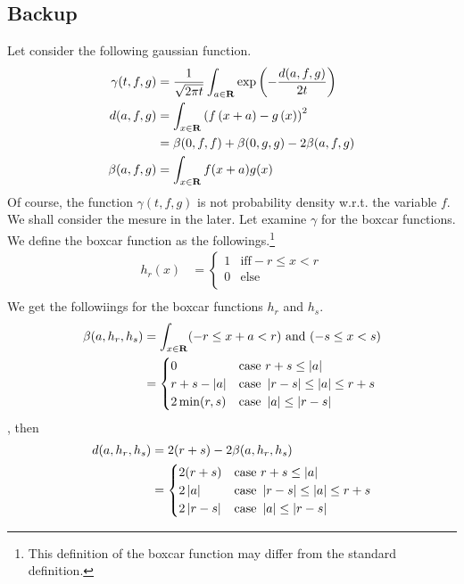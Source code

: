 \subsection{Backup}
Let consider the following gaussian function.
\begin{equation}\begin{split}\label{eq:f.gauss}
	\gamma(t,f,g) &= \frac{1}{\sqrt{2\pi t}}\int_{{a}\in{\mathbf{R}}}\exp\left({-\frac{d(a, f,g)}{2t}}\right) \\
	d(a,f,g) &= \int_{{x}\in{\mathbf{R}}}\left({f\left({x+a}\right)-g\left({x}\right)}\right)^2 \\
		&= \beta(0,f,f) + \beta(0,g,g) - 2\beta(a,f,g) \\
	\beta(a,f,g) &= \int_{{x}\in{\mathbf{R}}}f(x+a)g(x) \\
\end{split}\end{equation}
Of course, the function $\gamma(t,f,g)$ is not probability density w.r.t. the variable $f$.
We shall consider the mesure in the later.
Let examine $\gamma$ for the boxcar functions.
We define the boxcar function as the followings.\footnote {
	This definition of the boxcar function may differ from the standard definition.
}
\begin{equation}\begin{split}
	h_r(x) &= \begin{cases}
		1 & \text{iff} -r\le x< r \\
		0 & \text{else} \\
		\end{cases}\\
\end{split}\end{equation}
We get the followiings for the boxcar functions $h_r$ and $h_s$.
\begin{equation}\begin{split}
	\beta(a,h_r,h_s) &= \int_{{x}\in{\mathbf{R}}}(-r\le x+a< r)\text{ and }(-s\le x< s) \\
		&= \begin{cases}
			0 & \text{case } r+s\le\left|{a}\right| \\
			r+s-\left|{a}\right| & \text{case } \left|{r-s}\right|\le\left|{a}\right|\le r+s \\
			2\min(r,s) & \text{case } \left|{a}\right|\le\left|{r-s}\right| \\
		\end{cases}\\
\end{split}\end{equation}
, then
\begin{equation}\begin{split}
	d(a,h_r,h_s) &= 2(r+s) - 2\beta(a,h_r,h_s) \\
		&= \begin{cases}
			2(r+s) & \text{case } r+s\le\left|{a}\right| \\
			2\left|{a}\right| & \text{case } \left|{r-s}\right|\le\left|{a}\right|\le r+s \\
			2\left|{r-s}\right| & \text{case } \left|{a}\right|\le\left|{r-s}\right| \\
			\end{cases}
\end{split}\end{equation}
